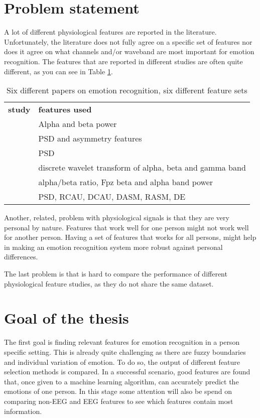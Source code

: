 \section{Problem statement}

A lot of different physiological features are reported in the literature. Unfortunately, the literature does not fully agree on a specific set of features nor does it agree on what channels and/or waveband are most important for emotion recognition. The features that  are reported in different studies are often quite different, as you can see in Table \ref{diffFeat}.

\begin{table}[]
\centering
\caption{Six different papers on emotion recognition, six different feature sets}
\label{diffFeat}
\begin{tabular}{ll}
\textbf{study} & \textbf{features used}                         \\
\citep{ref4}     & Alpha and beta power                           \\
\citep{ref7}     & PSD and asymmetry features                     \\
\citep{ref8}     & PSD                                            \\
\citep{ref6}     & discrete wavelet transform of alpha, beta and gamma band \\
\citep{ExtendedPaper}	&	alpha/beta ratio, Fpz beta and alpha band power \\
\citep{killyPaper} & PSD, RCAU, DCAU, DASM, RASM, DE \\
\end{tabular}
\end{table}

\npar

Another, related, problem with physiological signals is that they are very personal by nature. Features that work well for one person might not work well for another person\citep{DEAP}. Having a set of features that works for all persons, might help in making an emotion recognition system more robust against personal differences. 

\npar

The last problem is that is hard to compare the performance of different physiological feature studies, as they do not share the same dataset. 

\section{Goal of the thesis}
The first goal is finding relevant features for emotion recognition in a person specific setting. This is already quite challenging as there are fuzzy boundaries and individual variation of emotion\citep{emorecoghard}. To do so, the output of different feature selection methods is compared. In a successful scenario, good features are found that, once given to a machine learning algorithm, can accurately predict the emotions of one person. In this stage some attention will also be spend on comparing non-EEG and EEG features to see which features contain most information.

